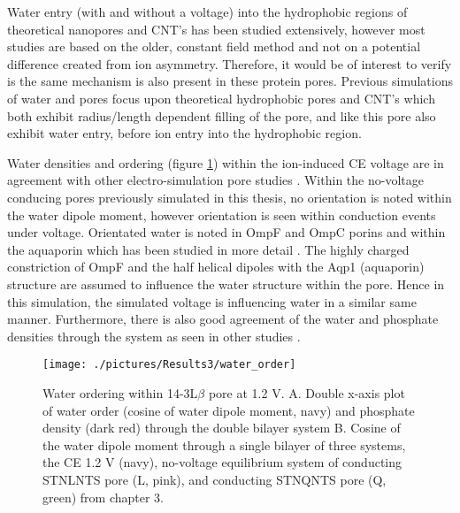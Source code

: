 Water entry (with and without a voltage) into the hydrophobic regions of theoretical nanopores and CNT's has been studied extensively, however most studies are based on the older, constant field method and not on a potential difference created from ion asymmetry. Therefore, it would be of interest to verify is the same mechanism is also present in these protein pores.  Previous simulations of water and pores focus upon theoretical hydrophobic pores \cite{Beckstein2001,Allen2003g} and CNT's \cite{Hummer2001,Waghe2002c} which both exhibit radius/length dependent filling of the pore, and like this pore also exhibit water entry, before ion entry into the hydrophobic region.

Water densities and ordering (figure \ref{fig:water_order}) within the ion-induced CE voltage are in agreement with other electro-simulation pore studies \cite{Dzubiella2005,Delemotte2012,Vernier2006a}. Within the no-voltage conducing pores previously simulated in this thesis, no orientation is noted within the water dipole moment, however orientation is seen within conduction events under voltage. Orientated water is noted in OmpF and OmpC porins \cite{Acosta2015} and within the aquaporin \cite{DeGroot2001,Tajkhorshid2002} which has been studied in more detail \cite{Gravelle2013,Tang2014c,Han2015}. The highly charged constriction of OmpF and the half helical dipoles with the Aqp1 (aquaporin) structure are assumed to influence the water structure within the pore. Hence in this simulation, the simulated voltage is influencing water in a similar same manner. Furthermore, there is also good agreement of the water and phosphate densities through the system as seen in other studies \cite{Ziegler2008a}.

\begin{figure}[H]
\begin{center}
\texttt{[image: ./pictures/Results3/water\_order]}
\caption[Water ordering within 14-3L$\beta$ pore at 1.2 V.] {Water ordering within 14-3L$\beta$ pore at 1.2 V. A. Double x-axis plot of water order (cosine of water dipole moment, navy) and phosphate density (dark red) through the double bilayer system B. Cosine  of the water dipole moment through a single bilayer of three systems, the CE 1.2 V (navy), no-voltage equilibrium system of conducting STNLNTS pore (L, pink), and conducting STNQNTS pore (Q, green) from chapter 3.}
\label{fig:water_order}
\end{center}
\end{figure}  


